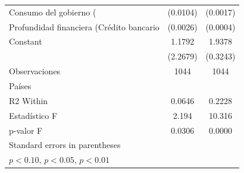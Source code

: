 \begin{table}[htbp]
\begin{tabular}{l*{2}{c}}
\addlinespace
Consumo del gobierno (%
                    &    (0.0104)         &    (0.0017)         \\
\addlinespace
Profundidad financiera (Crédito bancario %
                    &    (0.0026)         &    (0.0004)         \\
\addlinespace
Constant            &      1.1792         &      1.9378\sym{***}\\
                    &    (2.2679)         &    (0.3243)         \\
\midrule
Observaciones       &        1044         &        1044         \\
Países              &                     &                     \\
R2 Within           &      0.0646         &      0.2228         \\
Estadístico F       &       2.194         &      10.316         \\
p-valor F           &      0.0306         &      0.0000         \\
\bottomrule
\multicolumn{3}{l}{\footnotesize Standard errors in parentheses}\\
\multicolumn{3}{l}{\footnotesize \sym{*} \(p<0.10\), \sym{**} \(p<0.05\), \sym{***} \(p<0.01\)}\\
\end{tabular}
\end{table}
